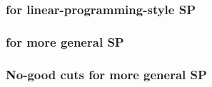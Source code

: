 \documentclass[twocolumn]{ctexart}
\begin{document}
\subsubsection{for linear-programming-style SP}


\subsubsection{for more general SP}


\subsubsection{No-good cuts for more general SP}


\begin{equation}
    \begin{aligned}
    \end{aligned}
\end{equation}
\end{document}

